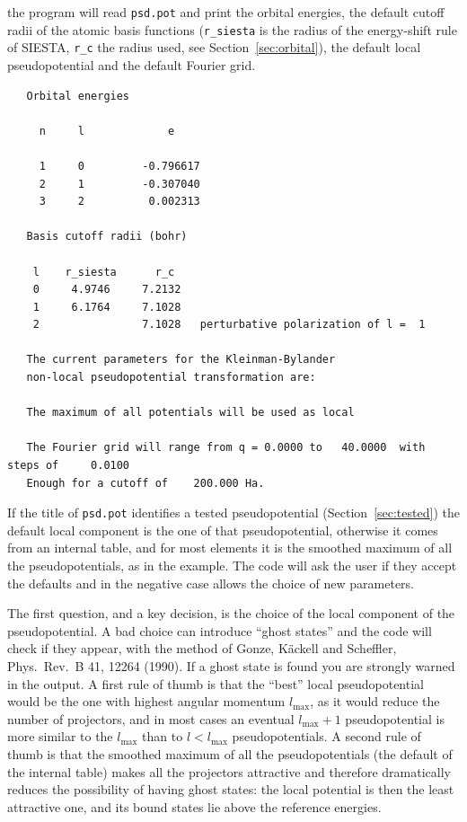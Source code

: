 \documentclass[11pt]{article}
\begin{document}
the program will read \texttt{psd.pot} and print the orbital energies,
the default cutoff radii of the atomic basis functions
(\texttt{r\_siesta} is the radius of the energy-shift rule of \textsc{SIESTA},
\texttt{r\_c} the radius used, see Section~\ref{sec:orbital}),
the default local pseudopotential and the default Fourier grid.
\begin{verbatim}
   Orbital energies

     n     l             e

     1     0         -0.796617
     2     1         -0.307040
     3     2          0.002313

   Basis cutoff radii (bohr)

    l    r_siesta      r_c
    0     4.9746     7.2132
    1     6.1764     7.1028
    2                7.1028   perturbative polarization of l =  1

   The current parameters for the Kleinman-Bylander
   non-local pseudopotential transformation are:

   The maximum of all potentials will be used as local

   The Fourier grid will range from q = 0.0000 to   40.0000  with steps of     0.0100
   Enough for a cutoff of    200.000 Ha.
\end{verbatim}
If the title of \texttt{psd.pot} identifies a tested pseudopotential
(Section~\ref{sec:tested}) the default local component is the one of that
pseudopotential, otherwise it comes from an internal table, and for most elements it is
the smoothed maximum of all the pseudopotentials, as in the example.
The code will ask the user if they accept the defaults and
in the negative case allows the choice of new parameters.

The first question, and a key decision,
is the choice of the local component of the pseudopotential.
A bad choice can introduce ``ghost states''
and the code will check if they appear, with the method of
Gonze, K\"ackell and Scheffler, Phys.\ Rev.\ B 41, 12264 (1990).
If a ghost state is found you are strongly warned in the output.
A first rule of thumb is that the ``best'' local pseudopotential would be the one with highest
angular momentum $l_\text{max}$, as it would reduce the number of projectors,
and in most cases an eventual $l_\text{max}+1$ pseudopotential is more similar to the
$l_\text{max}$ than to $l < l_\text{max}$ pseudopotentials.
A second rule of thumb is that the smoothed maximum of all the pseudopotentials
(the default of the internal table) makes all the projectors attractive and therefore dramatically reduces the
possibility of having ghost states: the local potential is then the least attractive one,
and its bound states lie above the reference energies.
\end{document}
